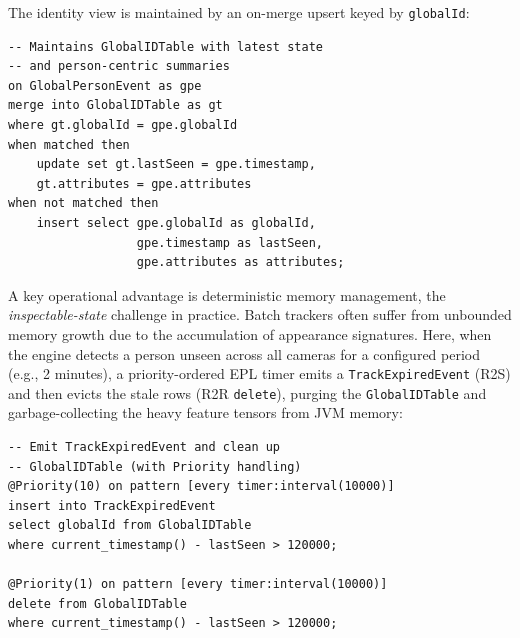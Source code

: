 \documentclass[5p,times]{elsarticle}
\begin{document}
The identity view is maintained by an on-merge upsert keyed by \texttt{globalId}:
{\small
\begin{verbatim}
-- Maintains GlobalIDTable with latest state 
-- and person-centric summaries
on GlobalPersonEvent as gpe
merge into GlobalIDTable as gt
where gt.globalId = gpe.globalId
when matched then
    update set gt.lastSeen = gpe.timestamp, 
    gt.attributes = gpe.attributes
when not matched then
    insert select gpe.globalId as globalId,
                  gpe.timestamp as lastSeen,
                  gpe.attributes as attributes;
\end{verbatim}
}
A key operational advantage is deterministic memory management, the \emph{inspectable-state} challenge in practice. Batch trackers often suffer from unbounded memory growth due to the accumulation of appearance signatures. Here, when the engine detects a person unseen across all cameras for a configured period (e.g., 2 minutes), a priority-ordered EPL timer emits a \texttt{TrackExpiredEvent} (R2S) and then evicts the stale rows (R2R \texttt{delete}), purging the \texttt{GlobalIDTable} and garbage-collecting the heavy feature tensors from JVM memory:
{\small
\begin{verbatim}
-- Emit TrackExpiredEvent and clean up 
-- GlobalIDTable (with Priority handling)
@Priority(10) on pattern [every timer:interval(10000)]
insert into TrackExpiredEvent 
select globalId from GlobalIDTable
where current_timestamp() - lastSeen > 120000;

@Priority(1) on pattern [every timer:interval(10000)]
delete from GlobalIDTable
where current_timestamp() - lastSeen > 120000;
\end{verbatim}
}

\end{document}

